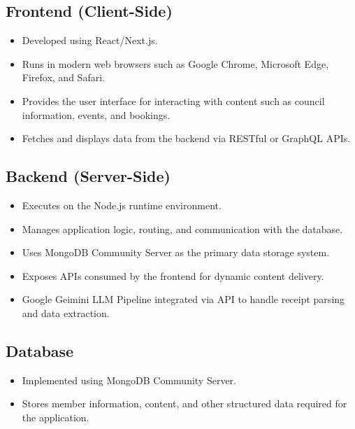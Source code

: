 \documentclass[12pt]{article}
\begin{document}
    \subsection{Frontend (Client-Side)}
    \begin{itemize}
        \item Developed using React/Next.js.
        \item Runs in modern web browsers such as Google Chrome, Microsoft Edge, Firefox, and Safari.
        \item Provides the user interface for interacting with content such as council information, events, and bookings.
        \item Fetches and displays data from the backend via RESTful or GraphQL APIs.
    \end{itemize}

    \subsection{Backend (Server-Side)}
    \begin{itemize}
        \item Executes on the Node.js runtime environment.
        \item Manages application logic, routing, and communication with the database.
        \item Uses MongoDB Community Server as the primary data storage system.
        \item Exposes APIs consumed by the frontend for dynamic content delivery.
        \item Google Geimini LLM Pipeline integrated via API to handle receipt parsing and data extraction.
    \end{itemize}

    \subsection{Database}
    \begin{itemize}
        \item Implemented using MongoDB Community Server.
        \item Stores member information, content, and other structured data required for the application.
    \end{itemize}
\end{document}
